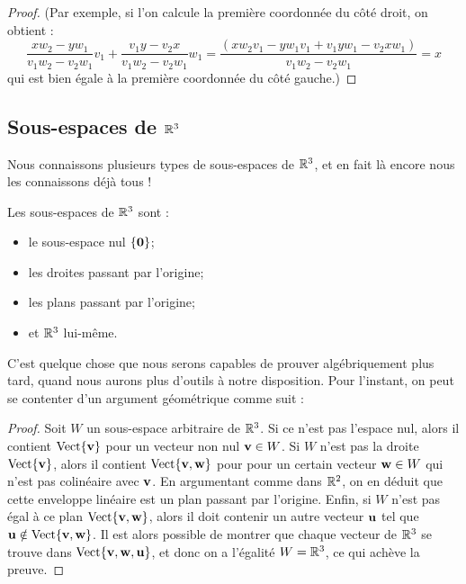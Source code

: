 \begin{proof}
(Par exemple, si l'on calcule la première coordonnée du côté droit, on obtient :
$$
\frac{xw_2-yw_1}{v_1w_2-v_2w_1}v_1 + \frac{v_1y-v_2x}{v_1w_2-v_2w_1}w_1 =
\frac{(xw_2v_1 - yw_1v_1 + v_1yw_1 - v_2xw_1)}{v_1w_2-v_2w_1} = x
$$
qui est bien égale à la première coordonnée du côté gauche.)
\end{proof}


\subsection{Sous-espaces de $\mathbb{R}^3$}
Nous connaissons plusieurs types de sous-espaces de $\mathbb{R}^3$, et en fait là encore
nous les connaissons déjà tous !

\begin{theorem}
Les  sous-espaces de $\mathbb{R}^3$ sont :
\begin{itemize}
\item le sous-espace nul $\{\mathbf{0}\}$;
\item les droites passant par l'origine;
\item les plans passant par l'origine;
\item et $\mathbb{R}^3$ lui-même.
\end{itemize}
\end{theorem}

C'est quelque chose que nous serons capables de prouver algébriquement plus tard, quand
nous aurons plus d'outils à notre disposition.  Pour l'instant, on peut se contenter d'un argument géométrique comme suit :

\begin{proof}
Soit $W$ un sous-espace arbitraire de $\mathbb{R}^3$.  Si ce n'est pas l'espace nul,
alors il contient $\textrm{Vect}\{\mathbf{v}\}$ pour un vecteur non nul $\mathbf{v} \in W$.
Si $W$ n'est pas la droite $\textrm{Vect}\{\mathbf{v}\}$, alors il contient $\textrm{Vect}\{\mathbf{v},\mathbf{w}\}$ pour
pour un certain vecteur $\mathbf{w}\in W$ qui n'est pas colinéaire avec $\mathbf{v}$.  En argumentant comme
dans $\mathbb{R}^2$, on en déduit que cette enveloppe linéaire est un plan passant par l'origine.
Enfin, si $W$ n'est pas égal à ce plan $\textrm{Vect}\{\mathbf{v},\mathbf{w}\}$, alors il doit contenir un autre vecteur $\mathbf{u}$ tel que $\mathbf{u} \notin \textrm{Vect}\{\mathbf{v},\mathbf{w}\}$.  Il est alors possible de montrer que chaque vecteur de $\mathbb{R}^3$ se trouve dans $\textrm{Vect}\{\mathbf{v},\mathbf{w},\mathbf{u}\}$, et donc on a l'égalité $W = \mathbb{R}^3$, ce qui achève la preuve.
\end{proof}

